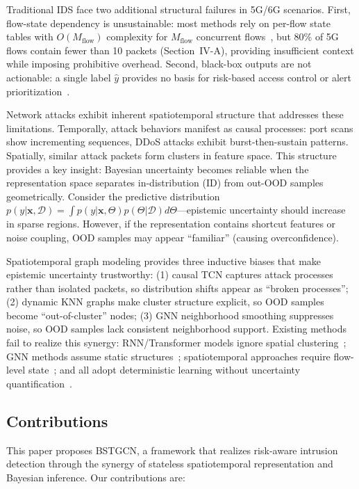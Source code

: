 \documentclass[lettersize,journal]{IEEEtran}
\begin{document}
Traditional IDS face two additional structural failures in 5G/6G scenarios. First, flow-state dependency is unsustainable: most methods rely on per-flow state tables with $O(M_{\text{flow}})$ complexity for $M_{\text{flow}}$ concurrent flows~\cite{Pekar2021}, but 80\% of 5G flows contain fewer than 10 packets (Section~IV-A), providing insufficient context while imposing prohibitive overhead. Second, black-box outputs are not actionable: a single label $\hat{y}$ provides no basis for risk-based access control or alert prioritization~\cite{NIST-ZTA,Afroogh2024TrustAI}.

Network attacks exhibit inherent spatiotemporal structure that addresses these limitations. Temporally, attack behaviors manifest as causal processes: port scans show incrementing sequences, DDoS attacks exhibit burst-then-sustain patterns. Spatially, similar attack packets form clusters in feature space. This structure provides a key insight: Bayesian uncertainty becomes reliable when the representation space separates in-distribution (ID) from out-OOD samples geometrically. Consider the predictive distribution $p(y|\mathbf{x},\mathcal{D}) = \int p(y|\mathbf{x},\Theta) p(\Theta|\mathcal{D}) d\Theta$---epistemic uncertainty should increase in sparse regions. However, if the representation contains shortcut features or noise coupling, OOD samples may appear ``familiar'' (causing overconfidence).

Spatiotemporal graph modeling provides three inductive biases that make epistemic uncertainty trustworthy: (1) causal TCN captures attack processes rather than isolated packets, so distribution shifts appear as ``broken processes''; (2) dynamic KNN graphs make cluster structure explicit, so OOD samples become ``out-of-cluster'' nodes; (3) GNN neighborhood smoothing suppresses noise, so OOD samples lack consistent neighborhood support. Existing methods fail to realize this synergy: RNN/Transformer models ignore spatial clustering~\cite{Habeeb_NIDS_AI_Survey_2022}; GNN methods assume static structures~\cite{lo2022egraphsage,E-ResGAT}; spatiotemporal approaches require flow-level state~\cite{EvolveGCN,TCG-IDS,PPT-GNN}; and all adopt deterministic learning without uncertainty quantification~\cite{BCNN-IDS,Tabarisaadi2024}.

\subsection{Contributions}

This paper proposes BSTGCN, a framework that realizes risk-aware intrusion detection through the synergy of stateless spatiotemporal representation and Bayesian inference. Our contributions are:
\end{document}
